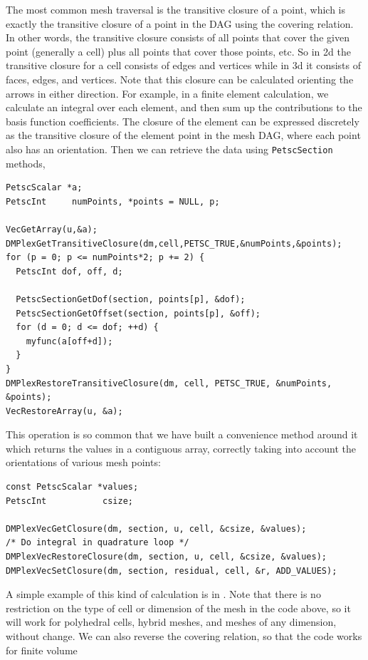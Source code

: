The most common mesh traversal is the transitive closure of a point, which is exactly the transitive closure of a point
in the DAG using the covering relation. In other words, the transitive closure consists of all points that cover the given point (generally a cell) plus all points that cover those points, etc. So in 2d the transitive closure for a cell consists of edges and vertices while in 3d it consists of faces, edges, and vertices. Note that this closure can be calculated orienting the arrows in either
direction. For example, in a finite element calculation, we calculate an integral over each element, and
then sum up the contributions to the basis function coefficients. The closure of the element can be expressed discretely
as the transitive closure of the element point in the mesh DAG, where each point also has an orientation. Then we can
retrieve the data using \lstinline{PetscSection} methods,
\begin{lstlisting}
PetscScalar *a;
PetscInt     numPoints, *points = NULL, p;

VecGetArray(u,&a);
DMPlexGetTransitiveClosure(dm,cell,PETSC_TRUE,&numPoints,&points);
for (p = 0; p <= numPoints*2; p += 2) {
  PetscInt dof, off, d;

  PetscSectionGetDof(section, points[p], &dof);
  PetscSectionGetOffset(section, points[p], &off);
  for (d = 0; d <= dof; ++d) {
    myfunc(a[off+d]);
  }
}
DMPlexRestoreTransitiveClosure(dm, cell, PETSC_TRUE, &numPoints, &points);
VecRestoreArray(u, &a);
\end{lstlisting}
This operation is so common that we have built a convenience method around it which returns the values in a contiguous
array, correctly taking into account the orientations of various mesh points:
\begin{lstlisting}
const PetscScalar *values;
PetscInt           csize;

DMPlexVecGetClosure(dm, section, u, cell, &csize, &values);
/* Do integral in quadrature loop */
DMPlexVecRestoreClosure(dm, section, u, cell, &csize, &values);
DMPlexVecSetClosure(dm, section, residual, cell, &r, ADD_VALUES);
\end{lstlisting}
A simple example of this kind of calculation is in \href{https://www.mcs.anl.gov/petsc/petsc-current/src/dm/impls/plex/plexfem.c.html#DMComputeL2Diff_Plex}{}. Note that there is no restriction on the
type of cell or dimension of the mesh in the code above, so it will work for polyhedral cells, hybrid meshes, and meshes
of any dimension, without change. We can also reverse the covering relation, so that the code works for finite volume
